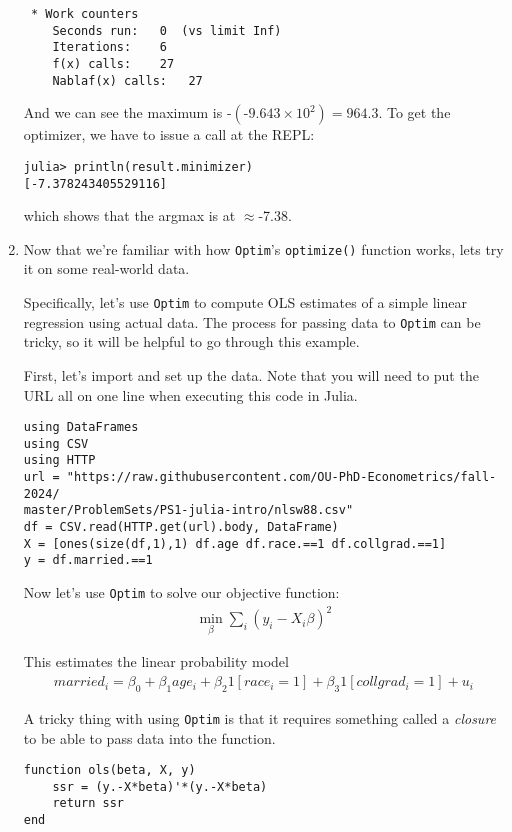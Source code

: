 \documentclass[12pt,english]{article}
\begin{document}
\begin{enumerate}
\begin{verbatim}
 * Work counters
    Seconds run:   0  (vs limit Inf)
    Iterations:    6
    f(x) calls:    27
    Nablaf(x) calls:   27
\end{verbatim}

And we can see the maximum is $\text{-}\left(\text{-}9.643\times 10^2\right)=964.3$. To get the optimizer, we have to issue a call at the REPL:
\begin{verbatim}
julia> println(result.minimizer)
[-7.378243405529116]
\end{verbatim}
which shows that the argmax is at $\approx$-7.38.

\item Now that we're familiar with how \texttt{Optim}'s \texttt{optimize()} function works, lets try it on some real-world data. 

Specifically, let's use \texttt{Optim} to compute OLS estimates of a simple linear regression using actual data. The process for passing data to \texttt{Optim} can be tricky, so it will be helpful to go through this example.

First, let's import and set up the data. Note that you will need to put the URL all on one line when executing this code in Julia.

\begin{verbatim}
using DataFrames
using CSV
using HTTP
url = "https://raw.githubusercontent.com/OU-PhD-Econometrics/fall-2024/
master/ProblemSets/PS1-julia-intro/nlsw88.csv"
df = CSV.read(HTTP.get(url).body, DataFrame)
X = [ones(size(df,1),1) df.age df.race.==1 df.collgrad.==1]
y = df.married.==1
\end{verbatim}

Now let's use \texttt{Optim} to solve our objective function:
\begin{align*}
    \min_\beta \sum_i\left(y_i - 
    X_i\beta\right)^2
\end{align*}

This estimates the linear probability model
\begin{align*}
    married_i = \beta_0 + \beta_1 age_i + \beta_2 1[race_i=1] + \beta_3 1[collgrad_i=1] + u_i
\end{align*}

A tricky thing with using \texttt{Optim} is that it requires something called a \textit{closure} to be able to pass data into the function.

\begin{verbatim}
function ols(beta, X, y)
    ssr = (y.-X*beta)'*(y.-X*beta)
    return ssr
end


\end{verbatim}
\end{enumerate}
\end{document}
